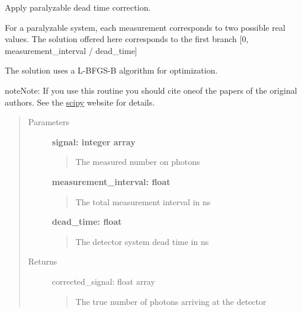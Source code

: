 \documentclass[letterpaper,10pt,english]{sphinxmanual}
\begin{document}
\begin{fulllineitems}
\label{pre_processing:pre_processing.correct_dead_time_paralyzable}
Apply paralyzable dead time correction.

For a paralyzable system, each measurement corresponds to two possible real
values. The solution offered here corresponds to the first branch {[}0, measurement\_interval / dead\_time{]}

The solution uses a L-BFGS-B algorithm for optimization.

\begin{notice}{note}{Note:}
If you use this routine you should cite oneof the papers of the original authors.
See the \href{http://docs.scipy.org/doc/scipy/reference/generated/scipy.optimize.fmin\_l\_bfgs\_b.html}{scipy} website
for details.
\end{notice}
\begin{quote}\begin{description}
\item[{Parameters}] \leavevmode
\textbf{signal: integer array}
\begin{quote}

The measured number on photons
\end{quote}

\textbf{measurement\_interval: float}
\begin{quote}

The total measurement interval in ns
\end{quote}

\textbf{dead\_time: float}
\begin{quote}

The detector system dead time in ns
\end{quote}

\item[{Returns}] \leavevmode
corrected\_signal: float array
\begin{quote}

The true number of photons arriving at the detector
\end{quote}

\end{description}\end{quote}

\end{fulllineitems}

\end{document}
